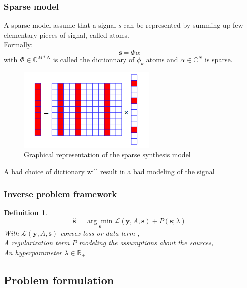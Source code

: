 \documentclass{article}
\numberwithin{dummy}{section}
\newtheorem{definitionT}{Definition}[section]
\newenvironment{definition}{\begin{dBox}\begin{definitionT}}{\end{definitionT}\end{dBox}}
\begin{document}
\subsubsection{Sparse model}
A sparse model assume that a signal $s$ can be represented by summing up  few elementary pieces of signal, called atoms.\\
Formally:
$$
\mathbf{s}=\Phi \alpha
$$
with $\Phi \in \mathbb{C}^{M*N}$ is called the dictionnary of $\phi_k$ atoms and $\alpha \in \mathbb{C}^N$ is sparse.
\begin{figure}[ht!]
    \centering
    \includegraphics[scale=0.7]{figures/ls.png}
    \caption{Graphical representation of the sparse synthesis model \cite{gaultier:tel-02148598}}
    \label{fig:f}
\end{figure}
\begin{warn}[Note:]
A bad choice of dictionary will result in a bad modeling of the signal 
\end{warn}
\subsubsection{Inverse problem framework}
\begin{definition}
$$
\hat{\mathbf{s}}=\underset{\mathbf{s}}{\arg \min } \mathcal{L}(\mathbf{y}, A, \mathbf{s})+P(\mathbf{s} ; \lambda)
$$
With $\mathcal{L}(\mathbf{y}, A, \mathbf{s})$ convex loss or data term ,\\
A regularization term $P$ modeling the assumptions about the sources,\\
An hyperparameter $\lambda \in \mathbb{R}_{+}$
\end{definition}

\subsection{Problem formulation}
\end{document}
